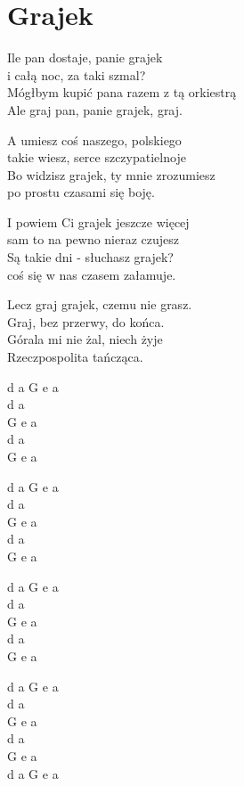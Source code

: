 \section{Grajek}
\begin{text}

Ile pan dostaje, panie grajek\\
i całą noc, za taki szmal?\\
Mógłbym kupić pana razem z tą orkiestrą\\
Ale graj pan, panie grajek, graj.

\hfill\break
A umiesz coś naszego, polskiego\\
takie wiesz, serce szczypatielnoje\\
Bo widzisz grajek, ty mnie zrozumiesz\\
po prostu czasami się boję.

\hfill\break
I powiem Ci grajek jeszcze więcej\\
sam to na pewno nieraz czujesz\\
Są takie dni - słuchasz grajek?\\
coś się w nas czasem załamuje.

\hfill\break
Lecz graj grajek, czemu nie grasz.\\
Graj, bez przerwy, do końca.\\
Górala mi nie żal, niech żyje\\
Rzeczpospolita tańcząca.
\end{text}
\begin{chord}
d a G e a\\
d a\\
G e a\\
d a\\
G e a

d a G e a\\
d a\\
G e a\\
d a\\
G e a

d a G e a\\
d a\\
G e a\\
d a\\
G e a

d a G e a\\
d a\\
G e a\\
d a\\
G e a\\
d a G e a
\end{chord}